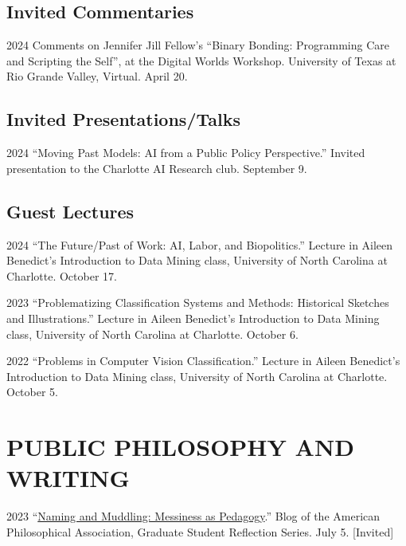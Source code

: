 \documentclass{article}
\begin{document}
\subsection*{\normalsize{Invited Commentaries}}
\begin{tablist}
    \item[2024] \tab{}Comments on Jennifer Jill Fellow's \enquote{Binary Bonding: Programming Care and Scripting the Self}, at the Digital Worlds Workshop. University of Texas at Rio Grande Valley, Virtual. April 20.
\end{tablist}

\subsection*{\normalsize{Invited Presentations/Talks}}
\begin{tablist}
    \item[2024] \tab{}\enquote{Moving Past Models: AI from a Public Policy Perspective.} Invited presentation to the Charlotte AI Research club. September 9.
\end{tablist}

\subsection*{\normalsize{Guest Lectures}}
\begin{tablist}
    \item[2024] \tab{}\enquote{The Future/Past of Work: AI, Labor, and Biopolitics.} Lecture in Aileen Benedict's Introduction to Data Mining class, University of North Carolina at Charlotte. October 17.
    \item[2023] \tab{}\enquote{Problematizing Classification Systems and Methods: Historical Sketches and Illustrations.} Lecture in Aileen Benedict's Introduction to Data Mining class, University of North Carolina at Charlotte. October 6.
    \item[2022] \tab{}\enquote{Problems in Computer Vision Classification.} Lecture in Aileen Benedict's Introduction to Data Mining class, University of North Carolina at Charlotte. October 5.
\end{tablist}


\section*{\normalsize{PUBLIC PHILOSOPHY AND WRITING}}
\begin{tablist}
    \item[2023] \tab{}\enquote{\href{https://blog.apaonline.org/2023/07/05/naming-and-muddling-messiness-as-pedagogy/}{Naming and Muddling: Messiness as Pedagogy}.} Blog of the American Philosophical Association, Graduate Student Reflection Series. July 5. [Invited]
\end{tablist}
\end{document}
